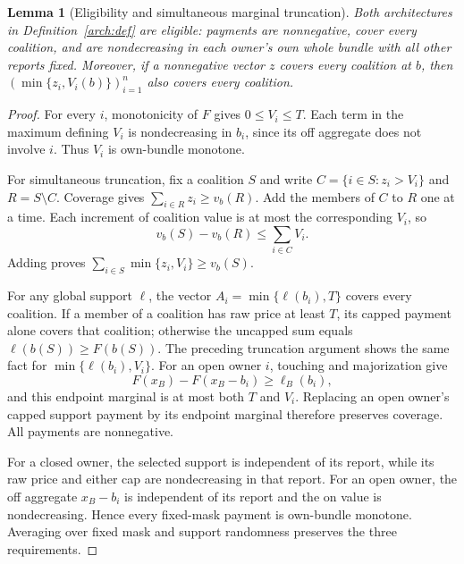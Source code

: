 \documentclass[11pt]{article}
\newtheorem{lemma}[theorem]{Lemma}
\theoremstyle{definition}\newtheorem{definition}[theorem]{Definition}
\theoremstyle{remark}\newtheorem{remark}[theorem]{Remark}
\begin{document}
\begin{lemma}[Eligibility and simultaneous marginal truncation]
\label{arch:caplemma}
Both architectures in Definition~\ref{arch:def} are eligible: payments are
nonnegative, cover every coalition, and are nondecreasing in each owner's
own whole bundle with all other reports fixed. Moreover, if a nonnegative
vector $z$ covers every coalition at $b$, then
$(\min\{z_i,V_i(b)\})_{i=1}^n$ also covers every coalition.
\end{lemma}
\begin{proof}
For every $i$, monotonicity of $F$ gives $0\le V_i\le T$. Each term in
the maximum defining $V_i$ is nondecreasing in $b_i$, since its off aggregate
does not involve $i$. Thus $V_i$ is own-bundle monotone.

For simultaneous truncation, fix a coalition $S$ and write
$C=\{i\in S:z_i>V_i\}$ and $R=S\setminus C$.
Coverage gives $\sum_{i\in R}z_i\ge v_b(R)$. Add the members of $C$ to $R$
one at a time. Each increment of coalition value is at most the corresponding
$V_i$, so
\[
 v_b(S)-v_b(R)\le\sum_{i\in C}V_i.
\]
Adding proves $\sum_{i\in S}\min\{z_i,V_i\}\ge v_b(S)$.

For any global support $\ell$, the vector
$A_i=\min\{\ell(b_i),T\}$ covers every coalition. If a member of a coalition
has raw price at least $T$, its capped payment alone covers that coalition;
otherwise the uncapped sum equals $\ell(b(S))\ge F(b(S))$.
The preceding truncation argument shows the same fact for
$\min\{\ell(b_i),V_i\}$. For an open owner $i$, touching and majorization
give
\[
 F(x_B)-F(x_B-b_i)\ge\ell_B(b_i),
\]
and this endpoint marginal is at most both $T$ and $V_i$.
Replacing an open owner's capped support payment by its endpoint marginal
therefore preserves coverage. All payments are nonnegative.

For a closed owner, the selected support is independent of its report, while
its raw price and either cap are nondecreasing in that report. For an open
owner, the off aggregate $x_B-b_i$ is independent of its report and the on
value is nondecreasing. Hence every fixed-mask payment is own-bundle
monotone. Averaging over fixed mask and support randomness preserves the
three requirements.
\end{proof}
\end{document}
